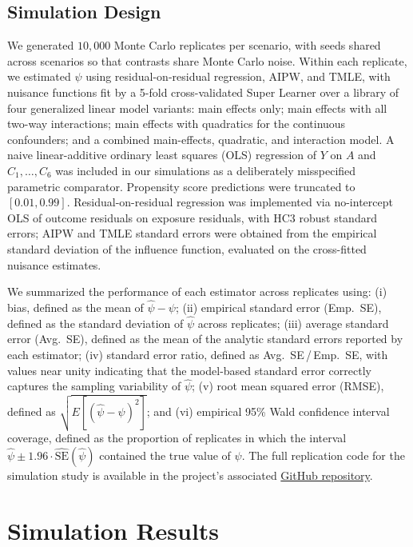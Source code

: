 \documentclass[12pt]{article}
\begin{document}
\subsection{Simulation Design}

We generated $10{,}000$ Monte Carlo replicates per scenario, with seeds shared across scenarios so that contrasts share Monte Carlo noise.\cite{Naimi2024b} Within each replicate, we estimated $\psi$ using residual-on-residual regression, AIPW, and TMLE, with nuisance functions fit by a 5-fold cross-validated Super Learner over a library of four generalized linear model variants: main effects only; main effects with all two-way interactions; main effects with quadratics for the continuous confounders; and a combined main-effects, quadratic, and interaction model. A naive linear-additive ordinary least squares (OLS) regression of $Y$ on $A$ and $C_1, \ldots, C_6$ was included in our simulations as a deliberately misspecified parametric comparator. Propensity score predictions were truncated to $[0.01, 0.99]$. Residual-on-residual regression was implemented via no-intercept OLS of outcome residuals on exposure residuals, with HC3 robust standard errors;\cite{Mansournia2021} AIPW and TMLE standard errors were obtained from the empirical standard deviation of the influence function,  evaluated on the cross-fitted nuisance estimates.

We summarized the performance of each estimator across replicates using: (i) bias, defined as the mean of $\hat{\psi} - \psi$; (ii) empirical standard error (Emp.~SE), defined as the standard deviation of $\hat{\psi}$ across replicates; (iii) average standard error (Avg.~SE), defined as the mean of the analytic standard errors reported by each estimator; (iv) standard error ratio, defined as Avg.~SE\,/\,Emp.~SE, with values near unity indicating that the model-based standard error correctly captures the sampling variability of $\hat{\psi}$; (v) root mean squared error (RMSE), defined as $\sqrt{E[(\hat{\psi} - \psi)^2]}$; and (vi) empirical 95\% Wald confidence interval coverage, defined as the proportion of replicates in which the interval $\hat{\psi} \pm 1.96 \cdot \widehat{\mathrm{SE}}(\hat{\psi})$ contained the true value of $\psi$. The full replication code for the simulation study is available in the project's associated \href{TBD}{GitHub repository}.

\section{Simulation Results}
\end{document}
